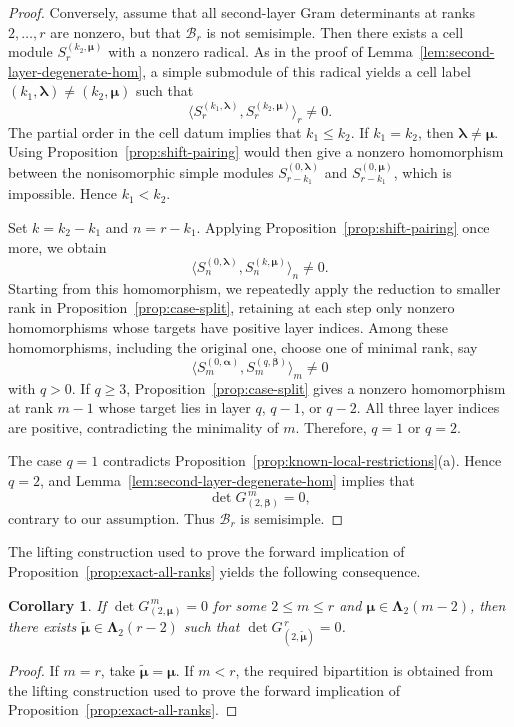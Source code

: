 \documentclass[10pt,a4paper]{amsart}
\newtheorem{corollary}[theorem]{Corollary}
\newcommand{\1}{\mathfrak{1}}
\newcommand{\B}{\mathcal{B}}
\begin{document}
\begin{proof}
Conversely, assume that all second-layer Gram determinants
at ranks $2,\ldots,r$ are nonzero, but that $\B_r$
is not semisimple.
Then there exists a cell module $S_r^{(k_2,\bm\mu)}$
with a nonzero radical.
As in the proof of
Lemma~\ref{lem:second-layer-degenerate-hom},
a simple submodule of this radical yields a cell label
$(k_1,\bm\lambda)\neq(k_2,\bm\mu)$ such that
$$
\langle
S_r^{(k_1,\bm\lambda)},S_r^{(k_2,\bm\mu)}
\rangle_r\neq0.
$$
The partial order in the cell datum implies that
$k_1\leq k_2$.
If $k_1=k_2$, then $\bm\lambda\neq\bm\mu$.
Using Proposition~\ref{prop:shift-pairing} would then give
a nonzero homomorphism between the nonisomorphic
simple modules $S_{r-k_1}^{(0,\bm\lambda)}$ and
$S_{r-k_1}^{(0,\bm\mu)}$, which is impossible.
Hence $k_1<k_2$.

Set $k=k_2-k_1$ and $n=r-k_1$.
Applying Proposition~\ref{prop:shift-pairing} once more, we obtain
$$
\langle
S_n^{(0,\bm\lambda)},S_n^{(k,\bm\mu)}
\rangle_n\neq0.
$$
Starting from this homomorphism, we repeatedly apply
the reduction to smaller rank in Proposition~\ref{prop:case-split}, retaining at each step
only nonzero homomorphisms whose targets have positive
layer indices.
Among these homomorphisms, including the original one,
choose one of minimal rank, say
$$
\langle
S_m^{(0,\bm\alpha)},S_m^{(q,\bm\beta)}
\rangle_m\neq0
$$
with $q>0$.
If $q\geq3$, Proposition~\ref{prop:case-split} gives
a nonzero homomorphism at rank $m-1$ whose target
lies in layer $q$, $q-1$, or $q-2$.
All three layer indices are positive, contradicting
the minimality of $m$.
Therefore, $q=1$ or $q=2$.

The case $q=1$ contradicts Proposition~\ref{prop:known-local-restrictions}(a).
Hence $q=2$, and
Lemma~\ref{lem:second-layer-degenerate-hom} implies that
$$
\det G_{(2,\bm\beta)}^{\,m}=0,
$$
contrary to our assumption.
Thus $\B_r$ is semisimple.
\end{proof}

The lifting construction used to prove the forward
implication of Proposition~\ref{prop:exact-all-ranks}
yields the following consequence.

\begin{corollary}\label{cor:exact-lift-degeneracy}
If $\det G_{(2,\bm\mu)}^{\,m}=0$ for some
$2\leq m\leq r$ and $\bm\mu\in\bm\Lambda_2(m-2)$,
then there exists
$\widetilde{\bm\mu}\in\bm\Lambda_2(r-2)$ such that
$\det G_{(2,\widetilde{\bm\mu})}^{\,r}=0$.
\end{corollary}

\begin{proof}
If $m=r$, take $\widetilde{\bm\mu}=\bm\mu$.
If $m<r$, the required bipartition is obtained from
the lifting construction used to prove the forward
implication of Proposition~\ref{prop:exact-all-ranks}.
\end{proof}
\end{document}
